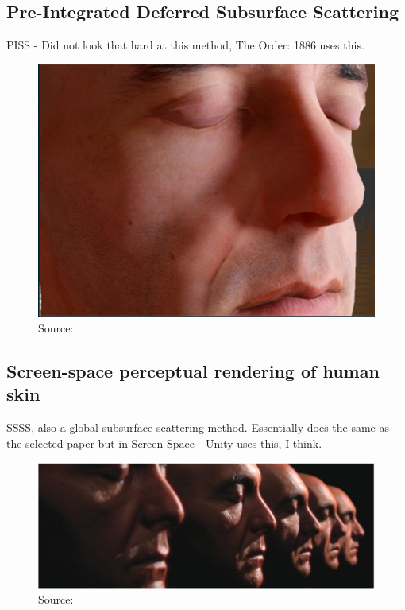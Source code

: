 \documentclass[ngerman,runningheads,a4paper]{llncs}[2018/03/10]
\begin{document}
\subsection{Pre-Integrated Deferred Subsurface Scattering}
\label{sub:pre-integrated}

\citet{pre-integrated-subsurface}

PISS - Did not look that hard at this method, The Order: 1886 uses this.

\begin{figure}[!h]
  \centering
  \includegraphics[scale=0.2,keepaspectratio]{./images/pre-integrated-ss.jpg}
  \caption{Source: \citet{pre-integrated-subsurface}}
\end{figure}

\subsection{Screen-space perceptual rendering of human skin}
\label{sub:screen-space}

\citet{screen-space-subsurface}

SSSS, also a global subsurface scattering method. Essentially does the same as the selected paper but in Screen-Space - Unity uses this, I think.

\begin{figure}[!h]
  \centering
  \includegraphics[scale=0.275,keepaspectratio]{./images/screen-space-sss.jpg}
  \caption{Source: \citet{screen-space-subsurface}}
\end{figure}
\end{document}

